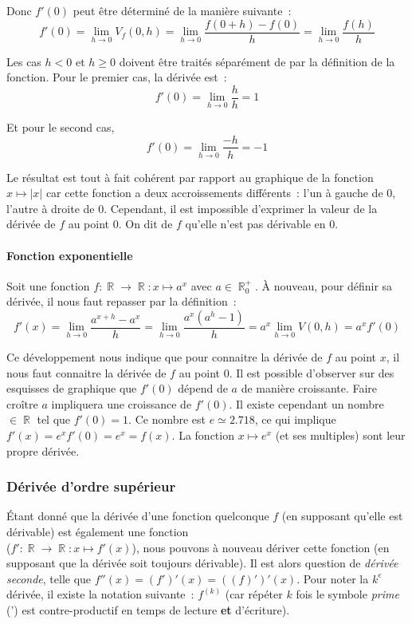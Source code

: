 \documentclass{article}
\DeclareMathOperator{\R}{\mathbb R}
\theoremstyle{definition}
\theoremstyle{remark}
\begin{document}
				Donc $f'(0)$ peut être déterminé de la manière suivante~:
				\[f'(0) = \lim_{h \to 0}V_f(0, h) = \lim_{h \to 0}\frac {f(0+h) - f(0)}{h} = \lim_{h \to 0}\frac {f(h)}{h}\]

				Les cas $h < 0$ et $h \ge 0$ doivent être traités séparément de par la définition de la fonction. Pour le premier cas,
				la dérivée est~:
				\[f'(0) = \lim_{h \to 0} \frac hh = 1\]

				Et pour le second cas,
				\[f'(0) = \lim_{h \to 0} \frac {-h}{h} = -1\]

				Le résultat est tout à fait cohérent par rapport au graphique de la fonction $x \mapsto |x|$ car cette fonction a deux
				accroissements différents~: l'un à gauche de 0, l'autre à droite de 0. Cependant, il est impossible d'exprimer la valeur
				de la dérivée de $f$ au point 0. On dit de $f$ qu'elle n'est pas dérivable en 0.

			\paragraph{Fonction exponentielle}
				Soit une fonction $f : \R \to \R : x \mapsto a^x$ avec $a \in \R_0^+$. À nouveau, pour définir sa
				dérivée, il nous faut repasser par la définition~:
				\[f'(x) = \lim_{h \to 0}\frac {a^{x+h} - a^x}{h} = \lim_{h \to 0}\frac {a^x(a^h - 1)}{h} = a^x\lim_{h \to 0}V(0, h) = a^xf'(0)\]

				Ce développement nous indique que pour connaitre la dérivée de $f$ au point $x$, il nous faut connaitre la dérivée de $f$
				au point $0$. Il est possible d'observer sur des esquisses de graphique que $f'(0)$ dépend de $a$ de manière croissante.
				Faire croître $a$ impliquera une croissance de $f'(0)$. Il existe cependant un nombre $\in \R$ tel que $f'(0) = 1$.
				Ce nombre est $e \simeq 2.718$, ce qui implique $f'(x) = e^xf'(0) = e^x = f(x)$. La fonction $x \mapsto e^x$ (et ses
				multiples) sont leur propre dérivée.

		\subsubsection{Dérivée d'ordre supérieur}
			Étant donné que la dérivée d'une fonction quelconque $f$ (en supposant qu'elle est dérivable) est également une fonction \\
			($f' : \R \to \R : x \mapsto f'(x)$), nous pouvons à nouveau dériver cette fonction (en supposant que la dérivée
			soit toujours dérivable). Il est alors question de \textit{dérivée seconde}, telle que $f''(x) = (f')'(x) = ((f)')'(x)$.
			Pour noter la $k^e$ dérivée, il existe la notation suivante~: $f^{(k)}$ (car répéter $k$ fois le symbole \textit{prime} (')
			est contre-productif en temps de lecture \textbf{et} d'écriture).
\end{document}
